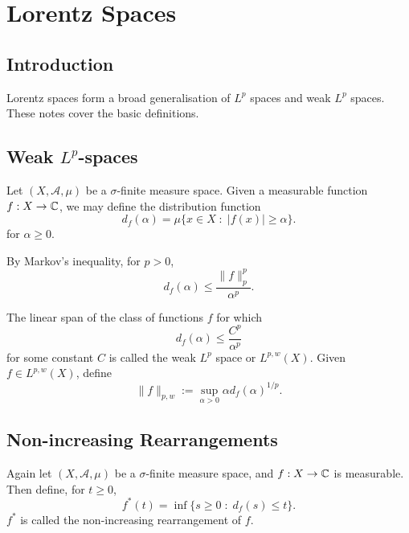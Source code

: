 
\chapter{Lorentz Spaces} %

\label{LorentzSpaces} %



\section{Introduction}
Lorentz spaces form a broad generalisation of $L^p$ spaces
and weak $L^p$ spaces. These notes cover the basic definitions.

\section{Weak $L^p$-spaces}
Let $(X,\mathcal{A},\mu)$ be a $\sigma$-finite measure space. 
Given a measurable function $f:X\rightarrow \mathbb{C}$, we may define the 
distribution function 
\begin{equation*}
    d_f(\alpha) = \mu\{x \in X\;:\;|f(x)| \geq \alpha\}.
\end{equation*}
for $\alpha \geq 0$. 

By Markov's inequality, for $p > 0$,
\begin{equation*}
    d_f(\alpha) \leq \frac{\|f\|_p^p}{\alpha^p}.
\end{equation*}

The linear span of the class of functions $f$ for which
\begin{equation*}
    d_f(\alpha) \leq \frac{C^p}{\alpha^p}
\end{equation*}
for some constant $C$ is called the weak $L^p$ space
or $L^{p,w}(X)$. Given $f \in L^{p,w}(X)$, define
\begin{equation*}
    \|f\|_{p,w} := \sup_{\alpha > 0} \alpha d_f(\alpha)^{1/p}.
\end{equation*}

\section{Non-increasing Rearrangements}
Again let $(X,\mathcal{A},\mu)$ be a $\sigma$-finite
measure space, and $f:X\rightarrow \mathbb{C}$ is measurable. Then define,
for $t \geq 0$,
\begin{equation*}
    f^*(t) = \inf\{s \geq 0\;:\;d_f(s) \leq t\}.
\end{equation*}
$f^*$ is called the non-increasing rearrangement of $f$.

